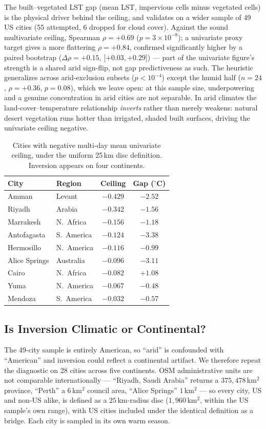 \documentclass[conference]{IEEEtran}
\begin{document}
The built--vegetated LST gap (mean LST, impervious cells minus vegetated
cells) is the physical driver behind the ceiling, and validates on a
wider sample of 49 US cities (55 attempted, 6 dropped for cloud cover).
Against the sound multivariate ceiling, Spearman $\rho{=}{+}0.69$
($p{=}3\times10^{-8}$); a univariate proxy target gives a more flattering
$\rho{=}{+}0.84$, confirmed significantly higher by a paired bootstrap
($\Delta\rho{=}{+}0.15$, [$+0.03,+0.29$]) — part of the univariate
figure's strength is a shared arid sign-flip, not gap predictiveness as
such. The heuristic generalizes across arid-exclusion subsets
($p{<}10^{-4}$) except the humid half ($n{=}24$, $\rho{=}{+}0.36$,
$p{=}0.08$), which we leave open: at this sample size, underpowering and a
genuine concentration in arid cities are not separable. In arid climates the land-cover--temperature relationship
\emph{inverts} rather than merely weakens: natural desert vegetation runs
hotter than irrigated, shaded built surfaces, driving the univariate
ceiling negative.

\begin{table}[ht]
  \centering
  \caption{Cities with negative multi-day mean univariate ceiling, under the
  uniform 25\,km disc definition. Inversion appears on four continents.}
  \label{tab:arid}
  \scriptsize
  \begin{tabular}{llcc}
    \toprule
    City & Region & Ceiling & Gap ($^{\circ}$C) \\
    \midrule
    Amman & Levant & $-0.429$ & $-2.52$ \\
    Riyadh & Arabia & $-0.342$ & $-1.56$ \\
    Marrakesh & N.~Africa & $-0.156$ & $-1.18$ \\
    Antofagasta & S.~America & $-0.124$ & $-3.38$ \\
    Hermosillo & N.~America & $-0.116$ & $-0.99$ \\
    Alice Springs & Australia & $-0.096$ & $-3.11$ \\
    Cairo & N.~Africa & $-0.082$ & $+1.08$ \\
    Yuma & N.~America & $-0.067$ & $-0.48$ \\
    Mendoza & S.~America & $-0.032$ & $-0.57$ \\
    \bottomrule
  \end{tabular}
\end{table}

\subsection{Is Inversion Climatic or Continental?}
The 49-city sample is entirely American, so ``arid'' is confounded with
``American'' and inversion could reflect a continental artifact. We
therefore repeat the diagnostic on 28 cities across five continents. OSM
administrative units are not comparable internationally --- ``Riyadh,
Saudi Arabia'' returns a $375{,}478$\,km$^2$ province, ``Perth'' a
$6$\,km$^2$ council area, ``Alice Springs'' $1$\,km$^2$ --- so every
city, US and non-US alike, is defined as a $25$\,km-radius disc
($1{,}960$\,km$^2$, within the US sample's own range), with US cities
included under the identical definition as a bridge. Each city is sampled
in its own warm season.
\end{document}

